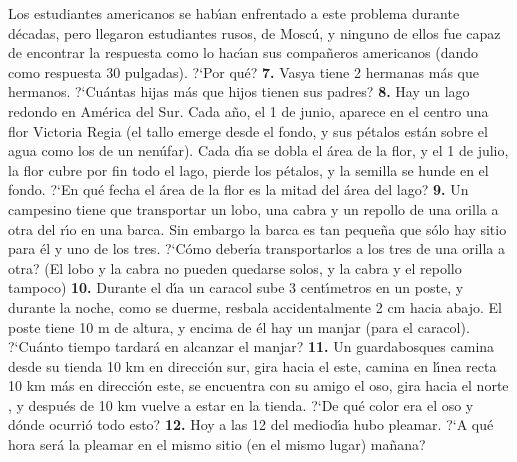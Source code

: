 \documentclass[12pt, spanish]{article}  %
\begin{document}
Los estudiantes americanos se hab\'{\i}an enfrentado a este problema durante d\'ecadas, pero llegaron estudiantes rusos,
 de Mosc\'u, y ninguno de ellos fue capaz de encontrar la respuesta como lo hac\'{\i}an sus compa\~neros americanos 
 (dando como respuesta 30 pulgadas). ?`Por qu\'e?
\newline\newline\quad
{\bf 7.} Vasya tiene 2 hermanas m\'as que hermanos. ?`Cu\'antas hijas m\'as que hijos tienen sus padres?
\newline\newline\quad
{\bf 8.} Hay un lago redondo en Am\'erica del Sur. Cada a\~no, el 1 de junio, aparece en el centro una flor Victoria Regia
 (el tallo emerge desde el fondo, y sus p\'etalos est\'an sobre el agua como los de un nen\'ufar). Cada d\'{\i}a se dobla
  el \'area de la flor, y el 1 de julio, la flor cubre por fin todo el lago, pierde los p\'etalos, y la semilla se hunde
   en el fondo. ?`En qu\'e fecha el \'area de la flor es la mitad del \'area del lago?    
\newline\newline\quad
{\bf 9.} Un campesino tiene que transportar un lobo, una cabra y un repollo de una orilla a otra del r\'{\i}o en una barca.
 Sin embargo la barca es tan peque\~na que s\'olo hay sitio para \'el y uno de los tres. ?`C\'omo deber\'{\i}a
  transportarlos a los tres de una orilla a otra? (El lobo y la cabra no pueden quedarse solos, y la cabra y el repollo
   tampoco)
\newline\newline\quad
{\bf 10.} Durante el d\'{\i}a un caracol sube 3 cent\'{\i}metros en un poste, y durante la noche, como se duerme, resbala
 accidentalmente 2 cm hacia abajo. El poste tiene 10 m de altura, y encima de \'el hay un manjar (para el caracol). 
  ?`Cu\'anto tiempo tardar\'a en alcanzar el manjar?
\newline\newline\quad
{\bf 11.} Un guardabosques camina desde su tienda 10 km en direcci\'on sur, gira hacia el este, camina en l\'{\i}nea recta
 10 km m\'as en direcci\'on este, se encuentra con su amigo el oso, gira hacia el norte , y despu\'es de 10 km vuelve a
  estar en la tienda. ?`De qu\'e color era el oso y d\'onde ocurri\'o todo esto?
\newline\newline\quad
{\bf 12.} Hoy a las 12 del mediod\'{\i}a hubo pleamar. ?`A qu\'e hora ser\'a la pleamar en el mismo sitio (en el mismo lugar)
 ma\~nana?
\newline\newline\quad
\end{document}
